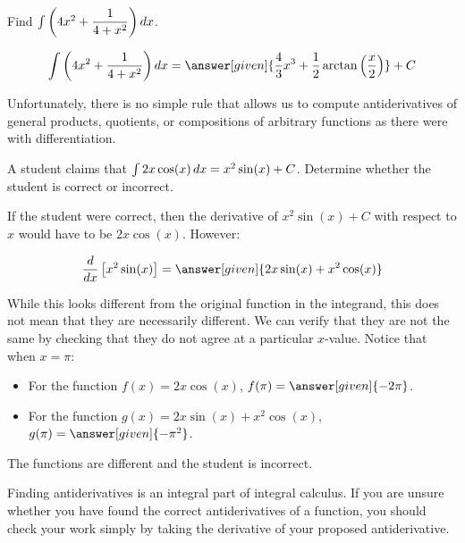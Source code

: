 \documentclass[nooutcomes]{ximera}
\begin{document}
\begin{question} 
  Find $\int \left(4x^2 + \dfrac{1}{4+x^2} \right)\mathop{}\!d x$.
  \begin{prompt} 
    \[
    \int \left(4x^2 + \dfrac{1}{4+x^2} \right) \d x  = \answer[given]{\frac{4}{3} x^3 + \frac{1}{2}\arctan\left(\frac{x}{2}\right)} +C 
    \]
  \end{prompt}
\end{question}



Unfortunately, there is no simple rule that allows us to compute antiderivatives of general products, quotients, or compositions of arbitrary functions as there were with differentiation. 


\begin{example}
  A student claims that $\int 2x \cos(x) \mathop{}\!d x = x^2 \sin(x) +C$.  Determine whether the student is correct or incorrect.
  
  \begin{explanation}
    If the student were correct, then the derivative of $x^2 \sin(x) +C$ with respect to $x$ would have to be $2x \cos(x)$.  However:
    
      \[\ddx \left[x^2 \sin(x)\right]= \answer[given]{2x \sin(x) +x^2 \cos(x)} \]
      
While this looks different from the original function in the integrand, this does not mean that they are necessarily different.  We can verify that they are not the same by checking that they do not agree at a particular $x$-value.  Notice that when $x=\pi$:
 
 \begin{itemize}
 \item For the function $f(x) = 2x \cos(x)$, $f(\pi) = \answer[given]{-2\pi}$.
 \item For the function $g(x) = 2x \sin(x) +x^2 \cos(x)$, $g(\pi) = \answer[given]{-\pi^2}$.
 \end{itemize}
 The functions are different and the student is incorrect.
  \end{explanation}
\end{example}

\begin{remark}
Finding antiderivatives is an integral part of integral calculus.  If you are unsure whether you have found the correct antiderivatives of a function, you should check your work simply by taking the derivative of your proposed antiderivative.  
\end{remark}
\end{document}
